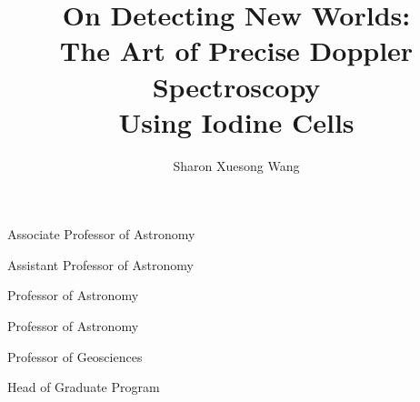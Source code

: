 \documentclass[11pt]{psuthesis}
\begin{document}
\title{On Detecting New Worlds: \\
  The Art of Precise Doppler Spectroscopy \\
  Using Iodine Cells}
\author{Sharon Xuesong Wang}


\begin{singlespace}

        {Associate Professor of Astronomy}

          {Assistant Professor of Astronomy}

          {Professor of Astronomy}

            {Professor of Astronomy}

           {Professor of Geosciences}

           {Head of Graduate Program}

\begin{frontmatter}


\begin{doublespace}

\frontmatter
\psutitlepage
\psucommitteepage
{}
\thesistableofcontents
\thesislistoffigures
\thesislistoftables
\end{doublespace}


\clearpage
{}
\end{frontmatter}

\thesismainmatter
\allowdisplaybreaks{








}


\backmatter



\pagebreak
{}
\end{singlespace}
\end{document}
